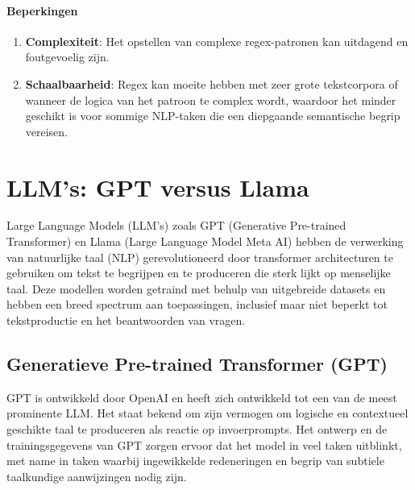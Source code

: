 \paragraph{Beperkingen}
\begin{enumerate}
    \item \textbf{Complexiteit}: Het opstellen van complexe regex-patronen kan uitdagend en foutgevoelig zijn.
    \item \textbf{Schaalbaarheid}: Regex kan moeite hebben met zeer grote tekstcorpora of wanneer de logica van het patroon te complex wordt, waardoor het minder geschikt is voor sommige NLP-taken die een diepgaande semantische begrip vereisen.
\end{enumerate}



\section{LLM's: GPT versus Llama}

Large Language Models (LLM's) zoals GPT (Generative Pre-trained Transformer) en Llama (Large Language Model Meta AI) hebben de verwerking van natuurlijke taal (NLP) gerevolutioneerd  door  transformer architecturen te gebruiken om tekst te begrijpen en te produceren die sterk lijkt op menselijke taal. Deze modellen worden getraind met behulp van uitgebreide datasets en hebben een breed spectrum aan toepassingen, inclusief maar niet beperkt tot tekstproductie en het beantwoorden van vragen.


\subsection{Generatieve Pre-trained Transformer (GPT)}

GPT is ontwikkeld door OpenAI en heeft zich ontwikkeld tot een van de meest prominente LLM. Het staat bekend om zijn vermogen om logische en contextueel geschikte taal te produceren als reactie op invoerprompts. Het ontwerp en de trainingsgegevens van GPT zorgen ervoor dat het model in veel taken uitblinkt, met name in taken waarbij ingewikkelde redeneringen en begrip van subtiele taalkundige aanwijzingen nodig zijn.



